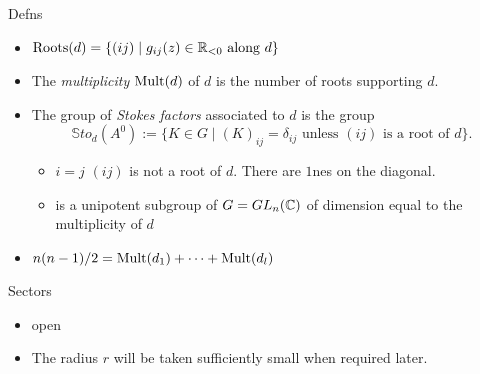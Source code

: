 \begin{frame}{Defns}
  \begin{itemize}
    \item $\operatorname{Roots}(d)=\{(ij)\mid g_{ij}(z)\in \mathbb{R}_{<0} \text{ along } d \}$
    \item The \emph{multiplicity} $\operatorname{Mult}(d)$ of $d$ is the number of roots
      supporting $d$.
    \item The group of \emph{Stokes factors} associated to $d$ is the group
    \[
      \mathbb{S}to_d(A^0) := \{K \in G \mid (K)_{ij}
        =\delta_{ij} \text{ unless } (ij) \text{ is a root of } d\}.
    \]
    \begin{itemize}
      \item $i=j$ \Rightarrow $(ij)$ is not a root of $d$. There are $1$nes on
        the diagonal.
      \item is a unipotent subgroup of $G=GL_n(\mathbb{C})$ of dimension equal to the
        multiplicity of $d$
    \end{itemize}
    \item $n(n-1)/2=\operatorname{Mult}(d_1)+\dots+\operatorname{Mult}(d_l)$
  \end{itemize}
\end{frame}

\begin{frame}{Sectors}
  \begin{center}
  \end{center}
  \begin{itemize}
    \item open
    \item The radius \textcolor{green!40!black}{$r$} will be taken sufficiently
    small when required later.
  \end{itemize}
\end{frame}

